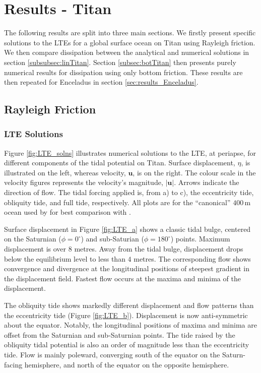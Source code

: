 \section{Results - Titan \label{sec:results_Titan}}

The following results are split into three main sections. We firstly present specific solutions to the LTEs for a global surface ocean on Titan using Rayleigh friction. We then compare dissipation between the analytical and numerical solutions in section \ref{subsubsec:linTitan}. Section \ref{subsec:botTitan} then presents purely numerical results for dissipation using only bottom friction. These results are then repeated for Enceladus in section \ref{sec:results_Enceladus}.

\subsection{Rayleigh Friction}

\subsubsection{LTE Solutions}

Figure \ref{fig:LTE_solns} illustrates numerical solutions to the LTE, at periapse, for different components of the tidal potential on Titan. Surface displacement, $\eta$, is illustrated on the left, whereas velocity, $\bm{u}$, is on the right. The colour scale in the velocity figures represents the velocity's magnitude, $\left| \bm{u} \right|$. Arrows indicate the direction of flow. The tidal forcing applied is, from a) to c), the eccentricity tide, obliquity tide, and full tide, respectively. All plots are for the ``canonical'' $400 \, \si{\metre}$ ocean used by \citet{sagan1982tide} for best comparison with \citet{sears1994tidal,sears1995tidal,sohl1995tidal}.

Surface displacement in Figure \ref{fig:LTE_a} shows a classic tidal bulge, centered on the Saturnian ($\phi = 0^{\circ}$) and sub-Saturian ($\phi = 180^{\circ}$) points. Maximum displacement is over $8$ metres. Away from the tidal bulge, displacement drops below the equilibrium level to less than $4$ metres. The corresponding flow shows convergence and divergence at the longitudinal positions of steepest gradient in the displacement field. Fastest flow occurs at the maxima and minima of the displacement.

The obliquity tide shows markedly different displacement and flow patterns than the eccentricity tide (Figure \ref{fig:LTE_b}). Displacement is now anti-symmetric about the equator. Notably, the longitudinal positions of maxima and minima are offset from the Saturnian and sub-Saturnian points. The tide raised by the obliquity tidal potential is also an order of magnitude less than the eccentricity tide. Flow is mainly poleward, converging south of the equator on the Saturn-facing hemisphere, and north of the equator on the opposite hemisphere.

